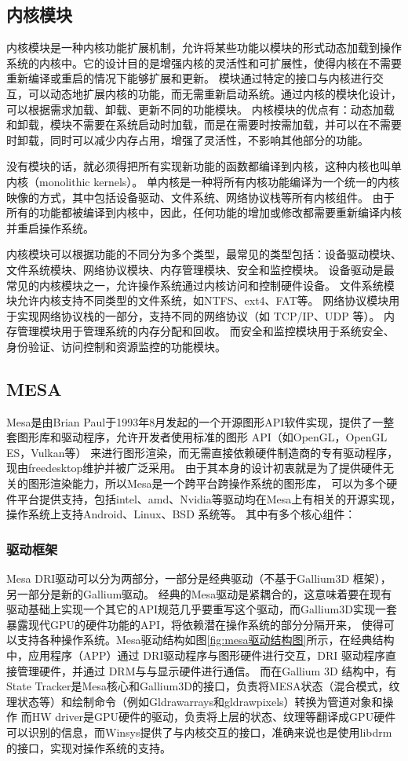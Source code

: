 \subsection{内核模块}
内核模块是一种内核功能扩展机制，允许将某些功能以模块的形式动态加载到操作系统的内核中。它的设计目的是增强内核的灵活性和可扩展性，使得内核在不需要重新编译或重启的情况下能够扩展和更新。
模块通过特定的接口与内核进行交互，可以动态地扩展内核的功能，而无需重新启动系统。通过内核的模块化设计，可以根据需求加载、卸载、更新不同的功能模块。
内核模块的优点有：动态加载和卸载，模块不需要在系统启动时加载，而是在需要时按需加载，并可以在不需要时卸载，同时可以减少内存占用，增强了灵活性，不影响其他部分的功能。

没有模块的话，就必须得把所有实现新功能的函数都编译到内核，这种内核也叫单内核（monolithic kernels）。
单内核是一种将所有内核功能编译为一个统一的内核映像的方式，其中包括设备驱动、文件系统、网络协议栈等所有内核组件。
由于所有的功能都被编译到内核中，因此，任何功能的增加或修改都需要重新编译内核并重启操作系统。

内核模块可以根据功能的不同分为多个类型，最常见的类型包括：设备驱动模块、文件系统模块、网络协议模块、内存管理模块、安全和监控模块。
设备驱动是最常见的内核模块之一，允许操作系统通过内核访问和控制硬件设备。
文件系统模块允许内核支持不同类型的文件系统，如NTFS、ext4、FAT等。
网络协议模块用于实现网络协议栈的一部分，支持不同的网络协议（如 TCP/IP、UDP 等）。
内存管理模块用于管理系统的内存分配和回收。
而安全和监控模块用于系统安全、身份验证、访问控制和资源监控的功能模块。

\subsection{MESA}
Mesa\cite{mesa}是由Brian Paul于1993年8月发起的一个开源图形API软件实现，提供了一整套图形库和驱动程序，允许开发者使用标准的图形 API（如OpenGL，OpenGL ES，Vulkan等）
来进行图形渲染，而无需直接依赖硬件制造商的专有驱动程序，现由freedesktop维护并被广泛采用。
由于其本身的设计初衷就是为了提供硬件无关的图形渲染能力，所以Mesa是一个跨平台跨操作系统的图形库，
可以为多个硬件平台提供支持，包括intel、amd、Nvidia等驱动均在Mesa上有相关的开源实现，操作系统上支持Android、Linux、BSD 系统等。
其中有多个核心组件：

\subsubsection{驱动框架}
Mesa DRI驱动可以分为两部分，一部分是经典驱动（不基于Gallium3D 框架），另一部分是新的Gallium驱动。
经典的Mesa驱动是紧耦合的，这意味着要在现有驱动基础上实现一个其它的API规范几乎要重写这个驱动，而Gallium3D实现一套暴露现代GPU的硬件功能的API，将依赖潜在操作系统的部分分隔开来，
使得可以支持各种操作系统。Mesa驱动结构如图\ref{fig:mesa驱动结构图}所示，在经典结构中，应用程序（APP）通过 DRI驱动程序与图形硬件进行交互，DRI 驱动程序直接管理硬件，并通过 DRM与与显示硬件进行通信。
而在Gallium 3D 结构中，有State Tracker是Mesa核心和Gallium3D的接口，负责将MESA状态（混合模式，纹理状态等）和绘制命令（例如Gldrawarrays和gldrawpixels）转换为管道对象和操作
而HW driver是GPU硬件的驱动，负责将上层的状态、纹理等翻译成GPU硬件可以识别的信息，而Winsys提供了与内核交互的接口，准确来说也是使用libdrm的接口，实现对操作系统的支持。

